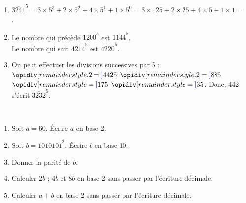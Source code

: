 \begin{corrige}
\ \\ [-5mm]
\begin{enumerate}
      \item $\overline{3241}^5 =3\times5^3+2\times5^2+4\times5^1+1\times5^0 =3\times125+2\times25+4\times5+1\times1 = $ {}.
      \item Le nombre qui précède $\overline{1200}^5$ est {\blue $\overline{1144}^5$}. \\
         Le nombre qui suit $\overline{4214}^5$ est {\blue $\overline{4220}^5$}.
      \item On peut effectuer les divisions successives par 5 : \\ [1mm]
      $\opidiv[remainderstyle.2=\textcolor{blue}]{442}{5}$ \quad $\opidiv[remainderstyle.2=\textcolor{blue}]{88}{5}$ \quad $\opidiv[remainderstyle=\textcolor{blue}]{17}{5}$ \quad $\opidiv[remainderstyle=\textcolor{blue}]{3}{5}$. \qquad Donc, 442 s'écrit {\blue $\overline{3232}^5$}.
   \end{enumerate}
\end{corrige}


\bigskip


\begin{exercice} %
\ \\ [-10mm]
\begin{enumerate}
      \item Soit $a=60$. Écrire $a$ en base 2.
      \item Soit $b=\overline{1010101}^2$. Écrire $b$ en base 10.
      \item Donner la parité de $b$.
      \item Calculer $2b$ ; $4b$ et $8b$ en base 2 sans passer par l'écriture décimale.
      \item Calculer $a+b$ en base 2 sans passer par l'écriture décimale.
   \end{enumerate}
\end{exercice} 


